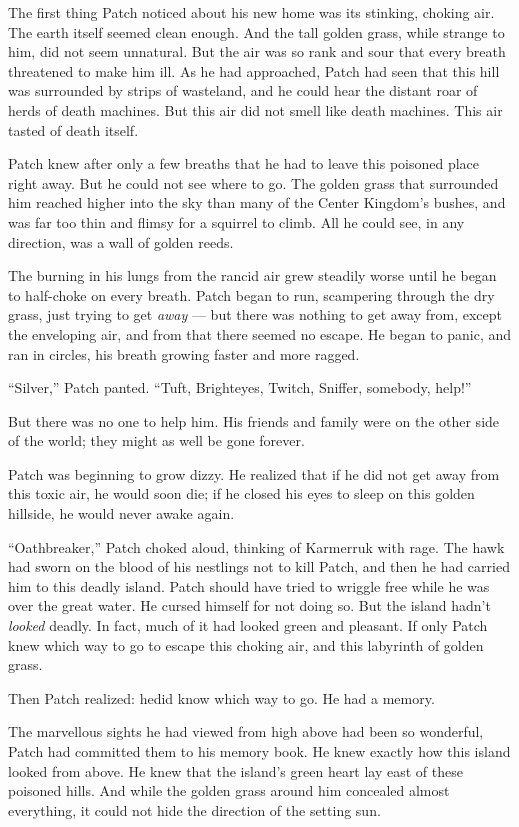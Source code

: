 \documentclass[ebook,oneside,openany,12pt]{memoir}
\begin{document}
The first thing Patch noticed about his new home was its stinking,
choking air. The earth itself seemed clean enough. And the tall golden
grass, while strange to him, did not seem unnatural. But the air was
so rank and sour that every breath threatened to make him ill. As he
had approached, Patch had seen that this hill was surrounded by strips
of wasteland, and he could hear the distant roar of herds of death
machines. But this air did not smell like death machines. This air
tasted of death itself.

Patch knew after only a few breaths that he had to leave this poisoned
place right away. But he could not see where to go. The golden grass
that surrounded him reached higher into the sky than many of the
Center Kingdom’s bushes, and was far too thin and flimsy for a
squirrel to climb. All he could see, in any direction, was a wall of
golden reeds.

The burning in his lungs from the rancid air grew steadily worse until
he began to half-choke on every breath. Patch began to run, scampering
through the dry grass, just trying to get \emph{away} — but there
was nothing to get away from, except the enveloping air, and from that
there seemed no escape. He began to panic, and ran in circles, his
breath growing faster and more ragged.

“Silver,” Patch panted. “Tuft, Brighteyes, Twitch, Sniffer, somebody,
help!”

But there was no one to help him. His friends and family were on the
other side of the world; they might as well be gone forever.

Patch was beginning to grow dizzy. He realized that if he did not get
away from this toxic air, he would soon die; if he closed his eyes to
sleep on this golden hillside, he would never awake again.

“Oathbreaker,” Patch choked aloud, thinking of Karmerruk with
rage. The hawk had sworn on the blood of his nestlings not to kill
Patch, and then he had carried him to this deadly island. Patch should
have tried to wriggle free while he was over the great water. He
cursed himself for not doing so. But the island hadn’t \emph{looked}
deadly. In fact, much of it had looked green and pleasant. If only
Patch knew which way to go to escape this choking air, and this
labyrinth of golden grass.

Then Patch realized: he\emph{}did know which way to go. He had a
memory.

The marvellous sights he had viewed from high above had been so
wonderful, Patch had committed them to his memory book. He knew
exactly how this island looked from above. He knew that the island’s
green heart lay east of these poisoned hills. And while the golden
grass around him concealed almost everything, it could not hide the
direction of the setting sun.
\end{document}
